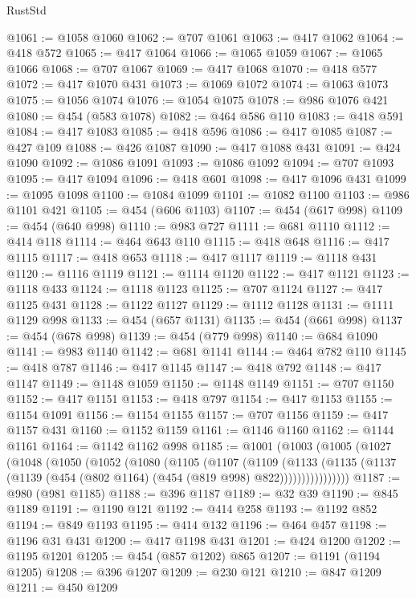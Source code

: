 \begin{lexlean}{RustStd}
\begin{coremodule}
@1061 := @1058 @1060
@1062 := @707 @1061
@1063 := @417 @1062
@1064 := @418 @572
@1065 := @417 @1064
@1066 := @1065 @1059
@1067 := @1065 @1066
@1068 := @707 @1067
@1069 := @417 @1068
@1070 := @418 @577
@1072 := @417 @1070 @431
@1073 := @1069 @1072
@1074 := @1063 @1073
@1075 := @1056 @1074
@1076 := @1054 @1075
@1078 := @986 @1076 @421
@1080 := @454 (@583 @1078)
@1082 := @464 @586 @110
@1083 := @418 @591
@1084 := @417 @1083
@1085 := @418 @596
@1086 := @417 @1085
@1087 := @427 @109
@1088 := @426 @1087
@1090 := @417 @1088 @431
@1091 := @424 @1090
@1092 := @1086 @1091
@1093 := @1086 @1092
@1094 := @707 @1093
@1095 := @417 @1094
@1096 := @418 @601
@1098 := @417 @1096 @431
@1099 := @1095 @1098
@1100 := @1084 @1099
@1101 := @1082 @1100
@1103 := @986 @1101 @421
@1105 := @454 (@606 @1103)
@1107 := @454 (@617 @998)
@1109 := @454 (@640 @998)
@1110 := @983 @727
@1111 := @681 @1110
@1112 := @414 @118
@1114 := @464 @643 @110
@1115 := @418 @648
@1116 := @417 @1115
@1117 := @418 @653
@1118 := @417 @1117
@1119 := @1118 @431
@1120 := @1116 @1119
@1121 := @1114 @1120
@1122 := @417 @1121
@1123 := @1118 @433
@1124 := @1118 @1123
@1125 := @707 @1124
@1127 := @417 @1125 @431
@1128 := @1122 @1127
@1129 := @1112 @1128
@1131 := @1111 @1129 @998
@1133 := @454 (@657 @1131)
@1135 := @454 (@661 @998)
@1137 := @454 (@678 @998)
@1139 := @454 (@779 @998)
@1140 := @684 @1090
@1141 := @983 @1140
@1142 := @681 @1141
@1144 := @464 @782 @110
@1145 := @418 @787
@1146 := @417 @1145
@1147 := @418 @792
@1148 := @417 @1147
@1149 := @1148 @1059
@1150 := @1148 @1149
@1151 := @707 @1150
@1152 := @417 @1151
@1153 := @418 @797
@1154 := @417 @1153
@1155 := @1154 @1091
@1156 := @1154 @1155
@1157 := @707 @1156
@1159 := @417 @1157 @431
@1160 := @1152 @1159
@1161 := @1146 @1160
@1162 := @1144 @1161
@1164 := @1142 @1162 @998
@1185 := @1001
    (@1003
      (@1005
        (@1027
          (@1048
            (@1050
              (@1052
                (@1080
                  (@1105
                    (@1107
                      (@1109
                        (@1133
                          (@1135
                            (@1137 (@1139 (@454 (@802 @1164) (@454 (@819 @998) @822))))))))))))))))
@1187 := @980 (@981 @1185)
@1188 := @396 @1187
@1189 := @32 @39
@1190 := @845 @1189
@1191 := @1190 @121
@1192 := @414 @258
@1193 := @1192 @852
@1194 := @849 @1193
@1195 := @414 @132
@1196 := @464 @457
@1198 := @1196 @31 @431
@1200 := @417 @1198 @431
@1201 := @424 @1200
@1202 := @1195 @1201
@1205 := @454 (@857 @1202) @865
@1207 := @1191 (@1194 @1205)
@1208 := @396 @1207
@1209 := @230 @121
@1210 := @847 @1209
@1211 := @450 @1209

\end{coremodule}
\end{lexlean}
